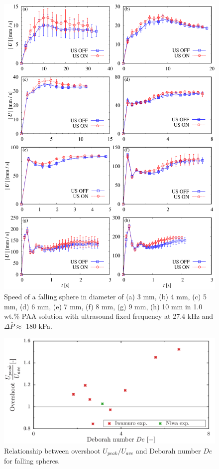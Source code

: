 \begin{figure}[ht]
    \begin{center}
        \includegraphics[width=13cm,clip]{5-Results/iwamuro-fall.png}
        \caption{Speed of a falling sphere in diameter of (a) 3 mm, (b) 4 mm, (c) 5 mm, (d) 6 mm, (e) 7 mm, (f) 8 mm, (g) 9 mm, (h) 10 mm in 1.0 wt.\% PAA solution with ultrasound fixed frequency at 27.4 kHz and $\Delta \bar{P} \approx$ 180 kPa\cite{ref:8}.}
        \label{fig:iwamuro-fall}
    \end{center}
\end{figure}

\begin{figure}[ht]
    \begin{center}
        \includegraphics[width=15cm,clip]{5-Results/De-overshoot.png}
        \caption{Relationship between overshoot $U_{peak}/U_{ave}$ and Deborah number $De$ for falling spheres.}
        \label{fig:De-overshoot}
    \end{center}
\end{figure}


